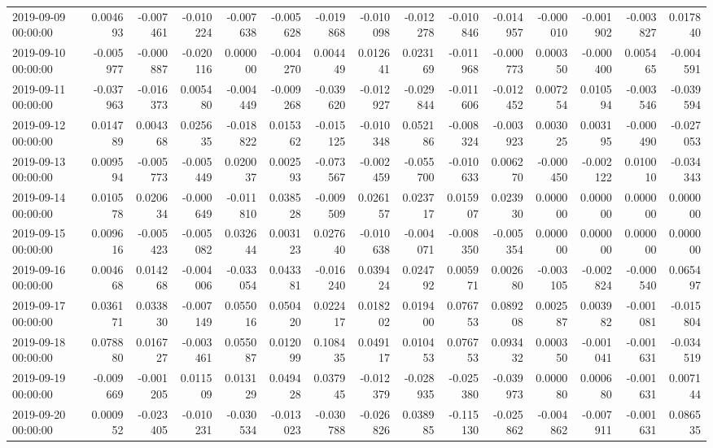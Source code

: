 \begin{tabular}{lrrrrrrrrrrrrrr}
2019-09-09 00:00:00 & 0.004693 & -0.007461 & -0.010224 & -0.007638 & -0.005628 & -0.019868 & -0.010098 & -0.012278 & -0.010846 & -0.014957 & -0.000010 & -0.001902 & -0.003827 & 0.017840 \\
2019-09-10 00:00:00 & -0.005977 & -0.000887 & -0.020116 & 0.000000 & -0.004270 & 0.004449 & 0.012641 & 0.023169 & -0.011968 & -0.000773 & 0.000350 & -0.000400 & 0.005465 & -0.004591 \\
2019-09-11 00:00:00 & -0.037963 & -0.016373 & 0.005480 & -0.004449 & -0.009268 & -0.039620 & -0.012927 & -0.029844 & -0.011606 & -0.012452 & 0.007254 & 0.010594 & -0.003546 & -0.039594 \\
2019-09-12 00:00:00 & 0.014789 & 0.004368 & 0.025635 & -0.018822 & 0.015362 & -0.015125 & -0.010348 & 0.052186 & -0.008324 & -0.003923 & 0.003025 & 0.003195 & -0.000490 & -0.027053 \\
2019-09-13 00:00:00 & 0.009594 & -0.005773 & -0.005449 & 0.020037 & 0.002593 & -0.073567 & -0.002459 & -0.055700 & -0.010633 & 0.006270 & -0.000450 & -0.002122 & 0.010010 & -0.034343 \\
2019-09-14 00:00:00 & 0.010578 & 0.020634 & -0.000649 & -0.011810 & 0.038528 & -0.009509 & 0.026157 & 0.023717 & 0.015907 & 0.023930 & 0.000000 & 0.000000 & 0.000000 & 0.000000 \\
2019-09-15 00:00:00 & 0.009616 & -0.005423 & -0.005082 & 0.032644 & 0.003123 & 0.027640 & -0.010638 & -0.004071 & -0.008350 & -0.005354 & 0.000000 & 0.000000 & 0.000000 & 0.000000 \\
2019-09-16 00:00:00 & 0.004668 & 0.014268 & -0.004006 & -0.033054 & 0.043381 & -0.016240 & 0.039424 & 0.024792 & 0.005971 & 0.002680 & -0.003105 & -0.002824 & -0.000540 & 0.065497 \\
2019-09-17 00:00:00 & 0.036171 & 0.033830 & -0.007149 & 0.055016 & 0.050420 & 0.022417 & 0.018202 & 0.019400 & 0.076753 & 0.089208 & 0.002587 & 0.003982 & -0.001081 & -0.015804 \\
2019-09-18 00:00:00 & 0.078880 & 0.016727 & -0.003461 & 0.055087 & 0.012099 & 0.108435 & 0.049117 & 0.010453 & 0.076753 & 0.093432 & 0.000350 & -0.001041 & -0.001631 & -0.034519 \\
2019-09-19 00:00:00 & -0.009669 & -0.001205 & 0.011509 & 0.013129 & 0.049428 & 0.037945 & -0.012379 & -0.028935 & -0.025380 & -0.039973 & 0.000080 & 0.000680 & -0.001631 & 0.007144 \\
2019-09-20 00:00:00 & 0.000952 & -0.023405 & -0.010231 & -0.030534 & -0.013023 & -0.030788 & -0.026826 & 0.038985 & -0.115130 & -0.025862 & -0.004862 & -0.007911 & -0.001631 & 0.086535 \\

\end{tabular}
